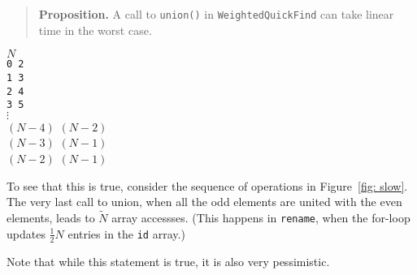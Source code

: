 \documentclass{tufte-handout}
\begin{document}
\begin{quote}
  {\bf Proposition.}
  A call to {\tt union()} in {\tt WeightedQuickFind} can take linear time in the worst case.
\end{quote}

\begin{marginfigure}
  \begin{tabbing}
    $N$\\
    {\tt 0 2}\\
    {\tt 1 3}\\
    {\tt 2 4}\\
    {\tt 3 5}\\
  $\vdots$\\
    $(N-4)$ $(N-2)$\\
    $(N-3)$ $(N-1)$\\
    $(N-2)$ $(N-1)$\\
  \end{tabbing}
\end{marginfigure}
To see that this is true, consider the sequence of operations in Figure~\ref{fig: slow}.
The very last call to union, when all the odd elements are united with the even elements, leads to $\tilde N$ array accessses.
(This happens in {\tt rename}, when the for-loop updates $\frac{1}{2}N$ entries in the {\tt id} array.)

Note that while this statement is true, it is also very pessimistic.
\end{document}
